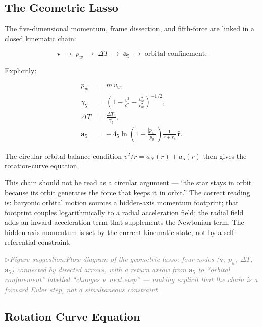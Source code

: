 \documentclass[11pt,a4paper]{article}
\newcommand{\pw}{p_w}                        %
\newcommand{\Lf}{\Lambda_5}                  %
\newcommand{\afive}{\mathbf{a}_5}            %
\newcommand{\afiver}{a_5}                    %
\newcommand{\rhat}{\hat{\mathbf{r}}}         %
\newcommand{\figsuggest}[1]{%
  \medskip
  \noindent\hspace{0pt}\textcolor{gray}{\small\itshape
    $\triangleright$\;Figure suggestion:\enspace #1}%
  \medskip}
\begin{document}
\subsection{The Geometric Lasso}\label{sec:lasso}

The five-dimensional momentum, frame dissection, and fifth-force are linked
in a closed kinematic chain:

\begin{keybox}
\[
  \mathbf{v} \;\longrightarrow\; \pw
  \;\longrightarrow\; \Delta T
  \;\longrightarrow\; \afive
  \;\longrightarrow\; \text{orbital confinement.}
\]
\end{keybox}

\noindent
Explicitly:

\begin{align}
  \pw &= m\,v_w , \\[4pt]
  \gamma_5 &= \left(1 - \frac{v^2}{c^2} - \frac{v_w^2}{c_w^2}\right)^{-1/2} , \\[4pt]
  \Delta T &= \frac{\Delta T_0}{\gamma_5} , \\[4pt]
  \afive &= -\Lf\ln\!\left(1+\frac{|\pw|}{p_0}\right)\frac{1}{r+r_c}\,\rhat .
\end{align}

The circular orbital balance condition $v^2/r = a_N(r) + \afiver(r)$ then
gives the rotation-curve equation.

This chain should not be read as a circular argument --- ``the star stays in
orbit because its orbit generates the force that keeps it in orbit.''
The correct reading is: baryonic orbital motion sources a hidden-axis momentum
footprint; that footprint couples logarithmically to a radial acceleration
field; the radial field adds an inward acceleration term that supplements
the Newtonian term.  The hidden-axis momentum is set by the current kinematic
state, not by a self-referential constraint.

\figsuggest{Flow diagram of the geometric lasso: four nodes ($\mathbf{v}$,
$\pw$, $\Delta T$, $\mathbf{a}_5$) connected by directed arrows, with a
return arrow from $\mathbf{a}_5$ to ``orbital confinement'' labelled
``changes $\mathbf{v}$ next step'' --- making explicit that the chain is
a forward Euler step, not a simultaneous constraint.}

\subsection{Rotation Curve Equation}\label{sec:rotcurve}
\end{document}
